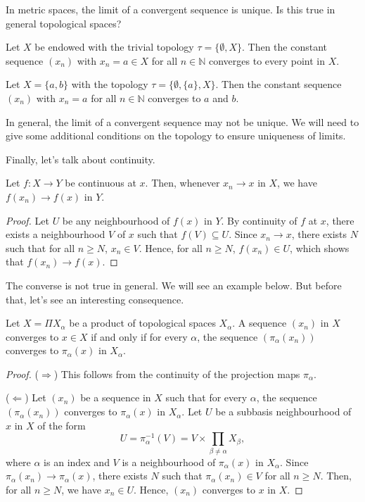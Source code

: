In metric spaces, the limit of a convergent sequence is unique. Is this true in general topological spaces?

\begin{example}
    Let $X$ be endowed with the trivial topology $\tau=\{\emptyset,X\}$. Then the constant sequence $(x_n)$ with $x_n=a\in X$ for all $n\in\mathbb{N}$ converges to every point in $X$. 
\end{example}

\begin{example}
    Let $X=\{a,b\}$ with the topology $\tau=\{\emptyset,\{a\},X\}$. Then the constant sequence $(x_n)$ with $x_n=a$ for all $n\in\mathbb{N}$ converges to $a$ and $b$. 
\end{example}

In general, the limit of a convergent sequence may not be unique. We will need to give some additional conditions on the topology to ensure uniqueness of limits.

Finally, let's talk about continuity.

\begin{proposition}
    Let $f:X\to Y$ be continuous at $x$. Then, whenever $x_n\to x$ in $X$, we have $f(x_n)\to f(x)$ in $Y$.
\end{proposition}
\begin{proof}
    Let $U$ be any neighbourhood of $f(x)$ in $Y$. By continuity of $f$ at $x$, there exists a neighbourhood $V$ of $x$ such that $f(V)\subseteq U$. Since $x_n \to x$, there exists $N$ such that for all $n \geq N$, $x_n \in V$. Hence, for all $n \geq N$, $f(x_n) \in U$, which shows that $f(x_n) \to f(x)$.
\end{proof}

The converse is not true in general. We will see an example below. But before that, let's see an interesting consequence.

\begin{theorem}
    Let $X=\Pi X_\alpha$ be a product of topological spaces $X_\alpha$. A sequence $(x_n)$ in $X$ converges to $x\in X$ if and only if for every $\alpha$, the sequence $(\pi_\alpha(x_n))$ converges to $\pi_\alpha(x)$ in $X_\alpha$.
\end{theorem}
\begin{proof}
    ($\Rightarrow$) This follows from the continuity of the projection maps $\pi_\alpha$.

    ($\Leftarrow$) Let $(x_n)$ be a sequence in $X$ such that for every $\alpha$, the sequence $(\pi_\alpha(x_n))$ converges to $\pi_\alpha(x)$ in $X_\alpha$. Let $U$ be a subbasis neighbourhood of $x$ in $X$ of the form  
    $$U=\pi_{\alpha}^{-1}(V)=V\times \prod_{\beta \neq \alpha} X_\beta,$$
    where $\alpha$ is an index and $V$ is a neighbourhood of $\pi_{\alpha}(x)$ in $X_{\alpha}$. 
    Since $\pi_{\alpha}(x_n)\to \pi_{\alpha}(x)$, there exists $N$ such that $\pi_{\alpha}(x_n)\in V$ for all $n\ge N$. Then, for all $n\ge N$, we have $x_n\in U$. Hence, $(x_n)$ converges to $x$ in $X$.
\end{proof}

